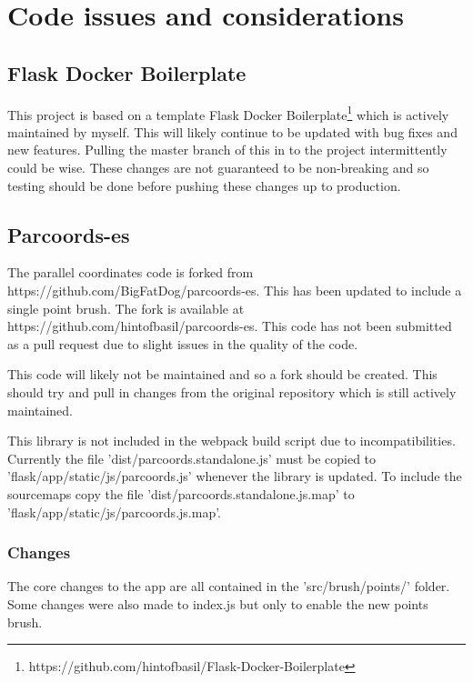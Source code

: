 \section{Code issues and considerations}

\subsection{Flask Docker Boilerplate} \label{sec:flask-docker-boilerplate}

This project is based on a template Flask Docker Boilerplate\footnote{https://github.com/hintofbasil/Flask-Docker-Boilerplate} which is actively maintained by myself.  This will likely continue to be updated with bug fixes and new features.  Pulling the master branch of this in to the project intermittently could be wise.  These changes are not guaranteed to be non-breaking and so testing should be done before pushing these changes up to production.

\subsection{Parcoords-es}

The parallel coordinates code is forked from https://github.com/BigFatDog/parcoords-es.  This has been updated to include a single point brush.  The fork is available at https://github.com/hintofbasil/parcoords-es.  This code has not been submitted as a pull request due to slight issues in the quality of the code.

This code will likely not be maintained and so a fork should be created.  This should try and pull in changes from the original repository which is still actively maintained.

This library is not included in the webpack build script due to incompatibilities.  Currently the file 'dist/parcoords.standalone.js' must be copied to 'flask/app/static/js/parcoords.js' whenever the library is updated.  To include the sourcemaps copy the file 'dist/parcoords.standalone.js.map' to 'flask/app/static/js/parcoords.js.map'.

\subsubsection{Changes}

The core changes to the app are all contained in the 'src/brush/points/' folder.  Some changes were also made to index.js but only to enable the new points brush.

